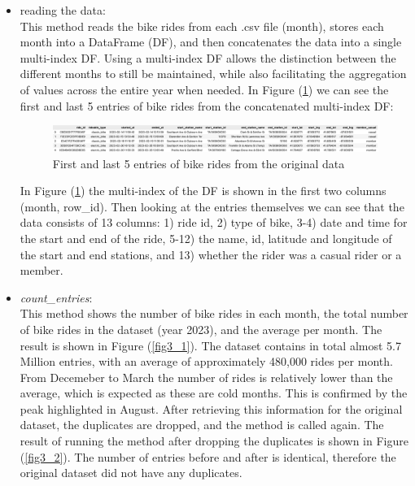 \documentclass[12pt]{article}
\begin{document}
\begin{itemize}
	\item reading the data:\\
	This method reads the bike rides from each .csv file (month), stores each month into a DataFrame (DF), and then concatenates the data into a single multi-index DF. Using a multi-index DF allows the distinction between the different months to still be maintained, while also facilitating the aggregation of values across the entire year when needed. In Figure (\ref{fig1}) we can see the first and last 5 entries of bike rides from the concatenated multi-index DF:

	\begin{figure}[h]
	\hspace{-1.1cm}
	\includegraphics[scale=0.45]{img1.png}
	\caption{First and last 5 entries of bike rides from the original data}
	\label{fig1}
	\end{figure}
	\pagebreak
	
	In Figure (\ref{fig1}) the multi-index of the DF is shown in the first two columns (month, row\_id). Then looking at the entries themselves we can see that the data consists of 13 columns: 1) ride id, 2) type of bike, 3-4) date and time for the start and end of the ride, 5-12) the name, id, latitude and longitude of the start and end stations, and 13) whether the rider was a casual rider or a member.  \\
	
	\item \textit{count\_entries}:\\
	This method shows the number of bike rides in each month, the total number of bike rides in the dataset (year 2023), and the average per month. The result is shown in Figure (\ref{fig3_1}). The dataset contains in total almost 5.7 Million entries, with an average of approximately 480,000 rides per month. From Decemeber to March the number of rides is relatively lower than the average, which is expected as these are cold months. This is confirmed by the peak highlighted in August. After retrieving this information for the original dataset, the duplicates are dropped, and the method is called again. The result of running the method after dropping the duplicates is shown in Figure (\ref{fig3_2}). The number of entries before and after is identical, therefore the original dataset did not have any duplicates.\\ 
	

\end{itemize}
\end{document}
